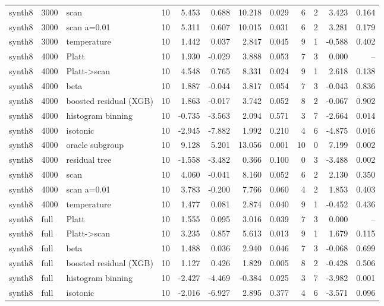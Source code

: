 \begin{tabular}{lllrrrrrrrrr}
synth8 & 3000 & scan & 10 & 5.453 & 0.688 & 10.218 & 0.029 & 6 & 2 & 3.423 & 0.164 \\
synth8 & 3000 & scan a=0.01 & 10 & 5.311 & 0.607 & 10.015 & 0.031 & 6 & 2 & 3.281 & 0.179 \\
synth8 & 3000 & temperature & 10 & 1.442 & 0.037 & 2.847 & 0.045 & 9 & 1 & -0.588 & 0.402 \\
synth8 & 4000 & Platt & 10 & 1.930 & -0.029 & 3.888 & 0.053 & 7 & 3 & 0.000 & -- \\
synth8 & 4000 & Platt->scan & 10 & 4.548 & 0.765 & 8.331 & 0.024 & 9 & 1 & 2.618 & 0.138 \\
synth8 & 4000 & beta & 10 & 1.887 & -0.044 & 3.817 & 0.054 & 7 & 3 & -0.043 & 0.836 \\
synth8 & 4000 & boosted residual (XGB) & 10 & 1.863 & -0.017 & 3.742 & 0.052 & 8 & 2 & -0.067 & 0.902 \\
synth8 & 4000 & histogram binning & 10 & -0.735 & -3.563 & 2.094 & 0.571 & 3 & 7 & -2.664 & 0.014 \\
synth8 & 4000 & isotonic & 10 & -2.945 & -7.882 & 1.992 & 0.210 & 4 & 6 & -4.875 & 0.016 \\
synth8 & 4000 & oracle subgroup & 10 & 9.128 & 5.201 & 13.056 & 0.001 & 10 & 0 & 7.199 & 0.002 \\
synth8 & 4000 & residual tree & 10 & -1.558 & -3.482 & 0.366 & 0.100 & 0 & 3 & -3.488 & 0.002 \\
synth8 & 4000 & scan & 10 & 4.060 & -0.041 & 8.160 & 0.052 & 6 & 2 & 2.130 & 0.350 \\
synth8 & 4000 & scan a=0.01 & 10 & 3.783 & -0.200 & 7.766 & 0.060 & 4 & 2 & 1.853 & 0.403 \\
synth8 & 4000 & temperature & 10 & 1.477 & 0.081 & 2.874 & 0.040 & 9 & 1 & -0.452 & 0.436 \\
synth8 & full & Platt & 10 & 1.555 & 0.095 & 3.016 & 0.039 & 7 & 3 & 0.000 & -- \\
synth8 & full & Platt->scan & 10 & 3.235 & 0.857 & 5.613 & 0.013 & 9 & 1 & 1.679 & 0.115 \\
synth8 & full & beta & 10 & 1.488 & 0.036 & 2.940 & 0.046 & 7 & 3 & -0.068 & 0.699 \\
synth8 & full & boosted residual (XGB) & 10 & 1.127 & 0.426 & 1.829 & 0.005 & 8 & 2 & -0.428 & 0.506 \\
synth8 & full & histogram binning & 10 & -2.427 & -4.469 & -0.384 & 0.025 & 3 & 7 & -3.982 & 0.001 \\
synth8 & full & isotonic & 10 & -2.016 & -6.927 & 2.895 & 0.377 & 4 & 6 & -3.571 & 0.096 \\

\end{tabular}

